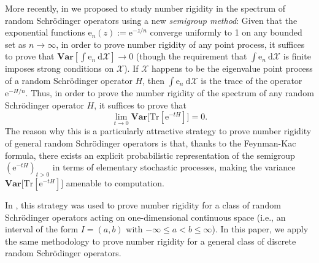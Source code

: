 \documentclass{amsart}
\numberwithin{equation}{section}
\theoremstyle{definition}
\renewcommand\d{~\mathrm d}
\newcommand\mbf{\mathbf}
\newcommand\mc{\mathcal}
\newcommand\mr{\mathrm}
\begin{document}
%

More recently, in \cite{GGL20} we proposed to study number rigidity in
the spectrum of random Schr\"odinger operators using a new {\it semigroup method}: Given that
the exponential functions $\mr e_n(z):=\mr e^{-z/n}$ converge uniformly to 1 on any bounded
set as $n\to\infty$, in order to prove number rigidity of any point process, it suffices to prove
that $\mbf{Var}[\int \mr e_n\d\mc X]\to0$ (though the requirement that $\int \mr e_n\d\mc X$
is finite imposes strong conditions on $\mc X$).
If $\mc X$ happens to be
the eigenvalue point process of a random Schr\"odinger operator $H$, then $\int \mr e_n\d\mc X$
is the trace of the operator $\mr e^{-H/n}$. Thus, in order to prove the number rigidity of the
spectrum of any random Schr\"odinger operator $H$, it suffices to prove that
\[\lim_{t\to0}\mbf{Var}\big[\mr{Tr}[\mr e^{-t H}]\big]=0.\]
The reason why this is a particularly attractive strategy to prove number rigidity of general
random Schr\"odinger operators is that, thanks to the Feynman-Kac formula, there
exists an explicit probabilistic representation of the semigroup $(\mr e^{-t H})_{t>0}$ in terms
of elementary stochastic processes, making the variance $\mbf{Var}\big[\mr{Tr}[\mr e^{-t H}]\big]$
amenable to computation.

%

In \cite{GGL20}, this strategy was used to prove number rigidity
for a class of random Schr\"odinger operators acting on one-dimensional continuous
space (i.e., an interval of the form $I=(a,b)$ with $-\infty\leq a<b\leq\infty$). In this paper,
we apply the same methodology to prove number rigidity for a general class of discrete
random Schr\"odinger operators.

%
\end{document}
